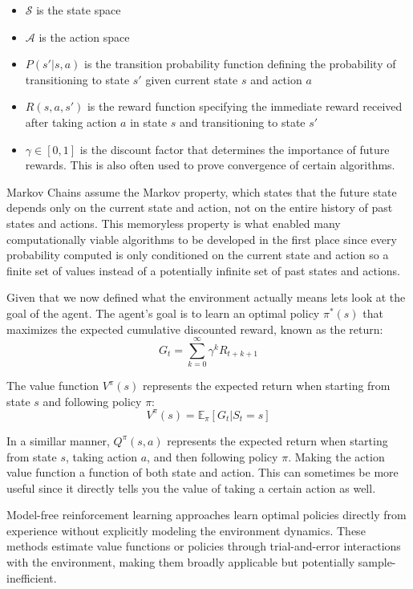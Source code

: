 \documentclass[
	english,
	ruledheaders=section,
	class=report,
	thesis={type=master},
	accentcolor=9c,
	custommargins=true,
	marginpar=false,
	parskip=half-,
	fontsize=11pt,
]{tudapub}
\begin{document}
\begin{itemize}
	\item $\mathcal{S}$ is the state space
	\item $\mathcal{A}$ is the action space
	\item $P(s'|s,a)$ is the transition probability function defining the probability of transitioning to state $s'$ given current state $s$ and action $a$
	\item $R(s,a,s')$ is the reward function specifying the immediate reward received after taking action $a$ in state $s$ and transitioning to state $s'$
	\item $\gamma \in [0,1]$ is the discount factor that determines the importance of future rewards. This is also often used to prove convergence of certain algorithms.
\end{itemize}

Markov Chains assume the Markov property, which states that the future state
depends only on the current state and action, not on the entire history of past
states and actions. This memoryless property is what enabled many
computationally viable algorithms to be developed in the first place since
every probability computed is only conditioned on the current state and action
so a finite set of values instead of a potentially infinite set of past states
and actions.

Given that we now defined what the environment actually means lets look at the
goal of the agent. The agent's goal is to learn an optimal policy $\pi^*(s)$
that maximizes the expected cumulative discounted reward, known as the return:
\begin{equation}
	G_t = \sum_{k=0}^{\infty} \gamma^k R_{t+k+1}
\end{equation}

The value function $V^\pi(s)$ represents the expected return when starting from
state $s$ and following policy $\pi$:
\begin{equation}
	V^\pi(s) = \mathbb{E}_\pi[G_t | S_t = s]
\end{equation}

In a simillar manner, $Q^\pi(s,a)$ represents the expected return when starting
from state $s$, taking action $a$, and then following policy $\pi$. Making the
action value function a function of both state and action. This can sometimes
be more useful since it directly tells you the value of taking a certain action
as well.

Model-free reinforcement learning approaches learn optimal policies directly
from experience without explicitly modeling the environment dynamics. These
methods estimate value functions or policies through trial-and-error
interactions with the environment, making them broadly applicable but
potentially sample-inefficient.
\end{document}

